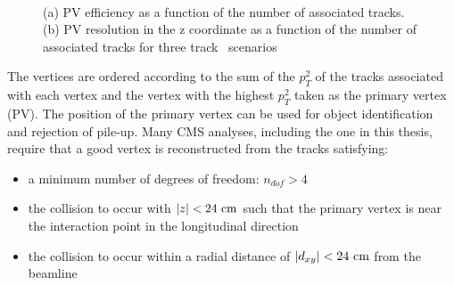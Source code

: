 \begin{figure}[hbt]
  \begin{center} 
   ~
   \caption{(a) PV efficiency as a function of the number of associated tracks. (b) PV
   resolution in the z coordinate as a function of the number of associated tracks for three track \pt~scenarios~\cite{tracker_seven}
   \label{fig:pvEffRes} }
  \end{center}
\end{figure}

The vertices are ordered according to the sum of the $p_T^2$ of the tracks associated with each vertex and
the vertex with the highest $p_T^2$ taken as the primary vertex (PV). The position of the primary vertex can
be used for object identification and rejection of pile-up. Many CMS analyses, including the one in this 
thesis, require that a good vertex is reconstructed from the tracks satisfying:

\begin{itemize}
\item a minimum number of degrees of freedom: $n_{dof} > 4$
\item the collision to occur with $|z| < 24\,\,\text{cm}$ such that the primary vertex is near the 
interaction point in the longitudinal direction
\item the collision to occur within a radial distance of $|d_{xy}| < 24\,\,\text{cm}$ from the beamline
\end{itemize}

